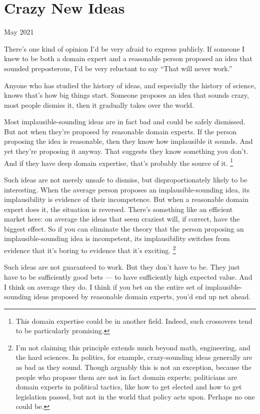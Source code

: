 \chapter{Crazy New Ideas}

May 2021

There's one kind of opinion I'd be very afraid to express publicly. If
someone I knew to be both a domain expert and a reasonable person
proposed an idea that sounded preposterous, I'd be very reluctant to say
``That will never work.''

Anyone who has studied the history of ideas, and especially the history
of science, knows that's how big things start. Someone proposes an idea
that sounds crazy, most people dismiss it, then it gradually takes over
the world.

Most implausible-sounding ideas are in fact bad and could be safely
dismissed. But not when they're proposed by reasonable domain experts.
If the person proposing the idea is reasonable, then they know how
implausible it sounds. And yet they're proposing it anyway. That
suggests they know something you don't. And if they have deep domain
expertise, that's probably the source of it. \footnote{This domain expertise could be in another field. Indeed, such
crossovers tend to be particularly promising.}

Such ideas are not merely unsafe to dismiss, but disproportionately
likely to be interesting. When the average person proposes an
implausible-sounding idea, its implausibility is evidence of their
incompetence. But when a reasonable domain expert does it, the situation
is reversed. There's something like an efficient market here: on average
the ideas that seem craziest will, if correct, have the biggest effect.
So if you can eliminate the theory that the person proposing an
implausible-sounding idea is incompetent, its implausibility switches
from evidence that it's boring to evidence that it's exciting.
\footnote{I'm not claiming this principle extends much beyond math,
engineering, and the hard sciences. In politics, for example,
crazy-sounding ideas generally are as bad as they sound. Though arguably
this is not an exception, because the people who propose them are not in
fact domain experts; politicians are domain experts in political
tactics, like how to get elected and how to get legislation passed, but
not in the world that policy acts upon. Perhaps no one could be.}

Such ideas are not guaranteed to work. But they don't have to be. They
just have to be sufficiently good bets --- to have sufficiently high
expected value. And I think on average they do. I think if you bet on
the entire set of implausible-sounding ideas proposed by reasonable
domain experts, you'd end up net ahead.

